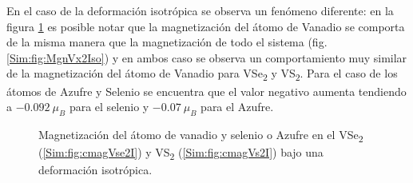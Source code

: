 \par En el caso de la deformaci\'on isotr\'opica se observa un fen\'omeno diferente: en la figura \ref{Sim:fig:cmagVX2I} es posible notar que la magnetizaci\'on del \'atomo de Vanadio se comporta de la misma manera que la magnetizaci\'on de todo el sistema (fig. \ref{Sim:fig:MgnVx2Iso}) y en ambos caso se observa un comportamiento muy similar de la magnetizaci\'on del \'atomo de Vanadio para  VSe\textsubscript{2} y  VS\textsubscript{2}. Para el caso de los \'atomos de Azufre y Selenio se encuentra que el valor negativo aumenta tendiendo  a $-0.092 ~\mu_{B}$ para el selenio y $-0.07~\mu_B $ para el Azufre. 
\begin{figure}[!hbt]
	\centering
	\caption[Magnetizaci\'on de los \'atomos individuales en el VS\textsubscript{2} y VSe\textsubscript{2} bajo una deformaci\'on isotr\'opica]{Magnetizaci\'on del \'atomo de vanadio y selenio o Azufre en el VSe\textsubscript{2} (\ref{Sim:fig:cmagVse2I}) y VS\textsubscript{2} (\ref{Sim:fig:cmagVs2I}) bajo una deformaci\'on isotr\'opica.}
	\label{Sim:fig:cmagVX2I}
\end{figure} 
